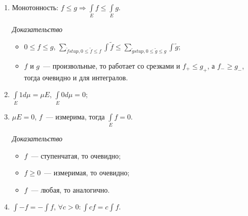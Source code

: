 \documentclass{article}
\begin{document}
        \begin{enumerate}
        
            \item Монотонность: $f \leqslant g \Rightarrow \int\limits_{E} f \leqslant \int\limits_{E} g$.
            
                \textit{Доказательство}
                
                    \begin{itemize}
                    
                        \item $0 \leqslant f \leqslant g$, $\sum\limits_{\widetilde{f} stup, 0 \leqslant \widetilde{f} \leqslant f} \int \widetilde{f} \leqslant \sum\limits_{\widetilde{g} stup, 0 \leqslant \widetilde{g} \leqslant g} \int \widetilde{g}$;
                        
                        \item $f$ и $g$~--- произвольные, то работает со срезками и $f_+ \leqslant g_+$, а $f_- \geqslant g_-$, тогда очевидно и для интегралов.
                        
                    \end{itemize}
            
            \item $\int\limits_{E} 1 d \mu = \mu E$, $\int\limits_{E} 0 d \mu = 0$;
            
            \item $\mu E = 0$, $f$~--- измерима, тогда $\int\limits_{E} f = 0$.
            
                \textit{Доказательство}
                
                    \begin{itemize}
                    
                        \item $f$~--- ступенчатая, то очевидно;
                        
                        \item $f \geqslant 0$~--- измеримая, то очевидно;
                        
                        \item $f$~--- любая, то аналогично.
                        
                    \end{itemize}
                    
            \item $\int -f = - \int f$, $\forall c > 0 : \int cf = c \int f$.
            

\end{enumerate}
\end{document}
